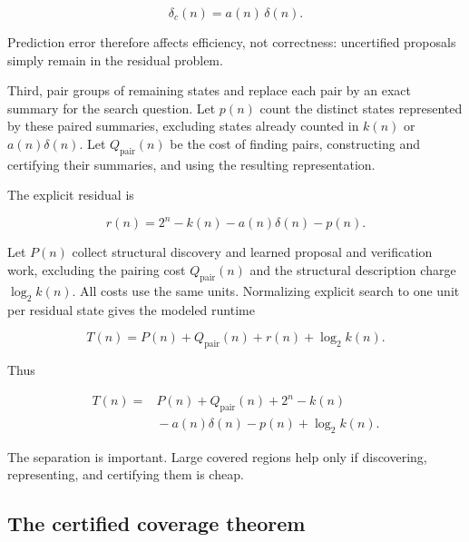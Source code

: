 \documentclass[
  10pt,
  english,
]{article}
\begin{document}
\[
\delta_c(n) = a(n)\,\delta(n).
\]

Prediction error therefore affects efficiency, not correctness:
uncertified proposals simply remain in the residual problem.

Third, pair groups of remaining states and replace each pair by an
exact summary for the search question. Let \(p(n)\) count the distinct
states represented by these paired summaries, excluding states already
counted in \(k(n)\) or \(a(n)\delta(n)\). Let
\(Q_{\mathrm{pair}}(n)\) be the cost of finding pairs, constructing and
certifying their summaries, and using the resulting representation.

The explicit residual is

\begin{tcolorbox}[accentbox]
\begin{equation}
r(n) = 2^n - k(n) - a(n)\delta(n) - p(n).
\end{equation}
\end{tcolorbox}

Let \(P(n)\) collect structural discovery and learned proposal and
verification work, excluding the pairing cost \(Q_{\mathrm{pair}}(n)\)
and the structural description charge \(\log_2 k(n)\). All costs use
the same units. Normalizing explicit search to one unit per residual
state gives the modeled runtime

\begin{tcolorbox}[paperbox]
\begin{equation}
T(n) = P(n) + Q_{\mathrm{pair}}(n) + r(n) + \log_2 k(n).
\end{equation}
\end{tcolorbox}

Thus

\begin{equation}
\begin{aligned}
T(n) ={}& P(n) + Q_{\mathrm{pair}}(n) + 2^n - k(n)\\
      &{}- a(n)\delta(n) - p(n) + \log_2 k(n).
\end{aligned}
\end{equation}

The separation is important. Large covered regions help only if
discovering, representing, and certifying them is cheap.

\hypertarget{the-certified-coverage-theorem}{%
\subsection{The certified coverage
theorem}\label{the-certified-coverage-theorem}}
\end{document}

